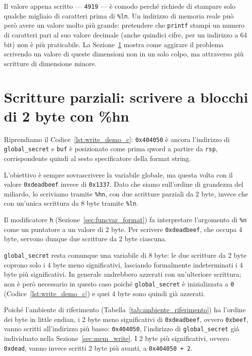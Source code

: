 Il valore appena scritto --- \texttt{4919} --- è comodo perché richiede di stampare solo qualche migliaio di caratteri prima di \texttt{\%ln}. Un indirizzo di memoria reale può però avere un valore molto più grande: pretendere che \texttt{printf} stampi un numero di caratteri pari al suo valore decimale (anche quindici cifre, per un indirizzo a 64 bit) non è più praticabile. La Sezione~\ref{sec:partial_write} mostra come aggirare il problema scrivendo un valore di queste dimensioni non in un solo colpo, ma attraverso più scritture di dimensione minore.


\section{Scritture parziali: scrivere a blocchi di 2 byte con \%hn}\label{sec:partial_write}
Riprendiamo il Codice~\ref{lst:write_demo_c}: \texttt{0x404050} è ancora l'indirizzo di \texttt{global\_secret} e \texttt{buf} è posizionato come prima qword a partire da \texttt{rsp}, corrispondente quindi al sesto specificatore della format string.

L'obiettivo è sempre sovrascrivere la variabile globale, ma questa volta con il valore \texttt{0xdeadbeef} invece di \texttt{0x1337}. Dato che siamo sull'ordine di grandezza del miliardo, lo scriviamo tramite \texttt{\%hn}, con due scritture parziali da 2 byte, invece che con un'unica scrittura da 8 byte tramite \texttt{\%ln}.

Il modificatore \texttt{h} (Sezione~\ref{sec:funcvar_format}) fa interpretare l'argomento di \texttt{\%n} come un puntatore a un valore di 2 byte. Per scrivere \texttt{0xdeadbeef}, che occupa 4 byte, servono dunque due scritture da 2 byte ciascuna.

\texttt{global\_secret} resta comunque una variabile di 8 byte: le due scritture da 2 byte coprono solo i 4 byte meno significativi, lasciando formalmente indeterminati i 4 byte più significativi. In generale andrebbero azzerati con un'ulteriore scrittura; non è però necessario in questo caso poiché \texttt{global\_secret} è inizializzata a \texttt{0} (Codice~\ref{lst:write_demo_c}) e quei 4 byte sono quindi già azzerati.

Poiché l'ambiente di riferimento (Tabella~\ref{tab:ambiente_riferimento}) ha l'ordine dei byte in little endian, i 2 byte meno significativi di \texttt{0xdeadbeef}, ovvero \texttt{0xbeef}, vanno scritti all'indirizzo più basso: \texttt{0x404050}, l'indirizzo di \texttt{global\_secret} già individuato nella Sezione~\ref{sec:mem_write}. I 2 byte più significativi, ovvero \texttt{0xdead}, vanno invece scritti 2 byte più avanti, a \texttt{0x404050 + 2}.

